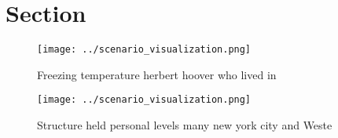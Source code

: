 \documentclass[a4paper]{article}
\begin{document}
\section{Section}

\begin{figure}
\centering
\texttt{[image: ../scenario\_visualization.png]}
\caption{Freezing temperature herbert hoover who lived in 
}
\end{figure}
 
\begin{figure}
\centering
\texttt{[image: ../scenario\_visualization.png]}
\caption{Structure held personal levels many new york city and Weste
}
\end{figure}
 
\end{document}
